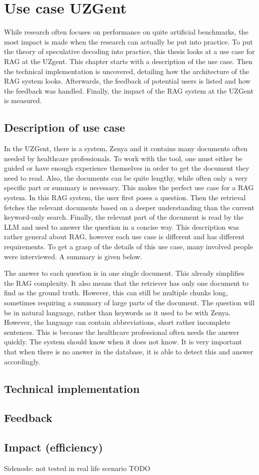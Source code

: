 
\chapter{Use case UZGent}
While research often focuses on performance on quite artificial benchmarks, the most impact is made when the research can actually be put into practice. To put the theory of speculative decoding into practice, this thesis looks at a use case for RAG at the UZgent. This chapter starts with a description of the use case. Then the technical implementation is uncovered, detailing how the architecture of the RAG system looks. Afterwards, the feedback of potential users is listed and how the feedback was handled. Finally, the impact of the RAG system at the UZGent is measured.

\section{Description of use case}
In the UZGent, there is a system, Zenya and it contains many documents often needed by healthcare professionals. To work with the tool, one must either be guided or have enough experience themselves in order to get the document they need to read. Also, the documents can be quite lengthy, while often only a very specific part or summary is necessary. This makes the perfect use case for a RAG system. In this RAG system, the user first poses a question. Then the retrieval fetches the relevant documents based on a deeper understanding than the current keyword-only search. Finally, the relevant part of the document is read by the LLM and used to answer the question in a concise way. This description was rather general about RAG, however each use case is different and has different requirements. To get a grasp of the details of this use case, many involved people were interviewed. A summary is given below.

The answer to each question is in one single document. This already simplifies the RAG complexity. It also means that the retriever has only one document to find as the ground truth. However, this can still be multiple chunks long, sometimes requiring a summary of large parts of the document.
The question will be in natural language, rather than keywords as it used to be with Zenya. However, the language can contain abbreviations, short rather incomplete sentences. This is because the healthcare professional often needs the answer quickly.
The system should know when it does not know. It is very important that when there is no answer in the database, it is able to detect this and answer accordingly.

\section{Technical implementation}

\section{Feedback}
\section{Impact (efficiency)}
Sidenode: not tested in real life scenario TODO
